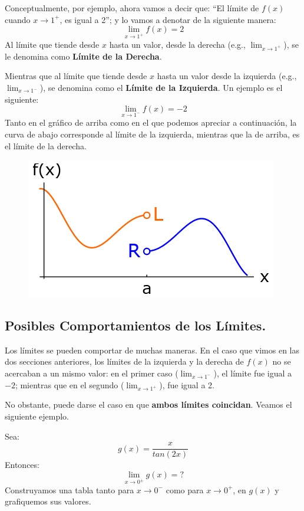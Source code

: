 \documentclass[12pt]{article}
\begin{document}
Conceptualmente, por ejemplo, ahora vamos a decir que: ``El límite de $f(x)$ cuando $x \to 1^{+}$, es igual a 2''; y lo vamos a denotar de la siguiente manera:
\[\lim_{x \to 1^{+}} f(x) =  2\]
Al límite que tiende desde $x$ hasta un valor, desde la derecha (e.g., $\lim_{x \to 1^{+}}$), se le denomina como \textbf{Límite de la Derecha}.

Mientras que al límite que tiende desde $x$ hasta un valor desde la izquierda (e.g., $\lim_{x \to 1^{-}}$), se denomina como el \textbf{Límite de la Izquierda}. Un ejemplo es el siguiente:
\[\lim_{x \to 1^{-}} f(x) = -2\]
Tanto en el gráfico de arriba como en el que podemos apreciar a continuación, la curva de abajo corresponde al límite de la izquierda, mientras que la de arriba, es el límite de la derecha.

\begin{figure}[hbt!]
\centering
\includegraphics[scale=0.7]{img/limit_plot_2.jpg}
\end{figure}


\subsection{Posibles Comportamientos de los Límites.}

Los límites se pueden comportar de muchas maneras. En el caso que vimos en las dos secciones anteriores, los límites de la izquierda y la derecha de $f(x)$ no se acercaban a un mismo valor: en el primer caso ($\lim_{x \to 1^{-}}$), el límite fue igual a $-2$; mientras que en el segundo ($\lim_{x \to 1^{+}}$), fue igual a 2.

No obstante, puede darse el caso en que \textbf{ambos límites coincidan}. Veamos el siguiente ejemplo.

Sea:
\[g(x) = \frac{x}{tan(2x)}\]
Entonces:
\[\lim_{x \to 0^{\pm}} g(x) = ?\]
Construyamos una tabla tanto para $x \to 0^{-}$ como para $x \to 0^{+}$, en $g(x)$ y grafiquemos sus valores.
\end{document}
